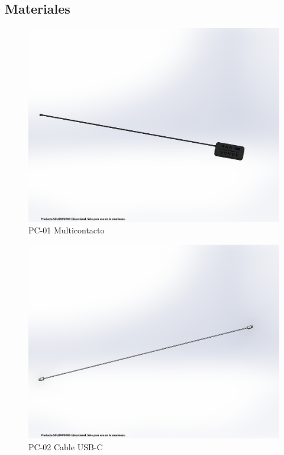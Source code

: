     \subsection{Materiales}
    \begin{figure}[H]
        \centering
        \includegraphics[trim = {5mm 50mm 15mm 60mm},clip,scale=0.2]{3/Img/multicontactoFigura.pdf}
        \caption{PC-01 Multicontacto}
        \label{fig:multicontactoFigura}
    \end{figure}
    \begin{figure}[H]
        \centering
        \includegraphics[trim = {1mm 50mm 1mm 60mm},clip,scale=0.2]{3/Img/cableUSB-CFigura.pdf}
        \caption{PC-02 Cable USB-C}
        \label{fig:cableUSB-CFigura}
    \end{figure}
